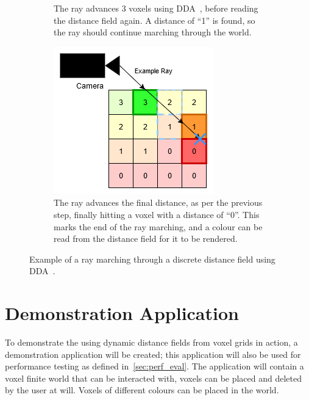 \begin{figure}[htbp]
\begin{subfigure}[t]{0.32\textwidth}
        \caption{The ray advances 3 voxels using DDA~\protect\cite{amanatides1987fast}, before reading the distance
            field again. A distance of ``1'' is found, so the ray should continue marching through the world.}
    \end{subfigure}
    \hfill
    \begin{subfigure}[t]{0.32\textwidth}
        \centering
        \includegraphics[width=\textwidth]{figures/df_dda_3.drawio.png}
        \caption{The ray advances the final distance, as per the previous step, finally hitting a voxel with a distance
            of ``0''. This marks the end of the ray marching, and a colour can be read from the distance field for it to
            be rendered.}
    \end{subfigure}
    \caption{Example of a ray marching through a discrete distance field using DDA~\protect\cite{amanatides1987fast}.}
    \label{fig:df_dda}
\end{figure}

\section{Demonstration Application}
To demonstrate the using dynamic distance fields from voxel grids in action, a demonstration application will be
created; this application will also be used for performance testing as defined in~\ref{sec:perf_eval}. The application
will contain a voxel finite world that can be interacted with, voxels can be placed and deleted by the user at will.
Voxels of different colours can be placed in the world.


